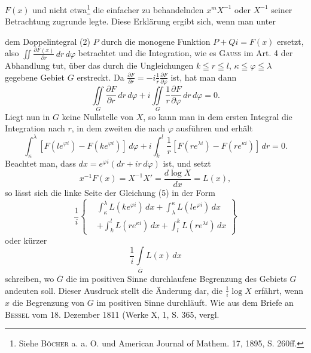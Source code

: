 \(F(x)\) und nicht etwa\footnote{Siehe \textsc{Bôcher} a. a. O. und American Journal of Mathem. 17, 1895, S. 260ff.} die einfacher zu behandelnden \(x^mX^{-1}\) oder \(X^{-1}\) seiner
Betrachtung zugrunde legte. Diese Erklärung ergibt sich, wenn man unter\par
\HistoricalFoot{}{21\textsuperscript{*}}
\clearpage{}
\noindent dem Doppelintegral (2) \(P\) durch die monogene Funktion \(P+Qi=F(x)\)
ersetzt, also \(\displaystyle\iint\frac{\partial F(x)}{\partial r}\,dr\,d\varphi\) betrachtet und die Integration, wie es \textsc{Gauss} im
Art. 4 der Abhandlung tut, über das durch die Ungleichungen \(k\leqq r\leqq l\),
\(\kappa\leqq\varphi\leqq\lambda\) gegebene Gebiet \(G\) erstreckt. Da \(\frac{\partial F}{\partial r}=-i\frac1r\frac{\partial F}{\partial\varphi}\) ist, hat man
dann
\[
\iint\limits_G\frac{\partial F}{\partial r}\,dr\,d\varphi
+i\iint\limits_G\frac1r\frac{\partial F}{\partial\varphi}\,dr\,d\varphi=0.
\]
Liegt nun in \(G\) keine Nullstelle von \(X\), so kann man in dem ersten Integral
die Integration nach \(r\), in dem zweiten die nach \(\varphi\) ausführen und erhält
\begingroup\makeatletter\tagsleft@true\let\veqno\leqno\makeatother
\begin{equation*}
\int_\kappa^\lambda[F(le^{\varphi i})-F(ke^{\varphi i})]\,d\varphi
+i\int_k^l\frac1r[F(re^{\lambda i})-F(re^{\kappa i})]\,dr=0.\tag{5}
\end{equation*}
\endgroup
\noindent Beachtet man, dass \(dx=e^{\varphi i}(dr+ir\,d\varphi)\) ist, und setzt
\[
x^{-1}F(x)=X^{-1}X'=\frac{d\log X}{dx}=L(x),
\]
so lässt sich die linke Seite der Gleichung (5) in der Form
\begingroup\makeatletter\tagsleft@true\let\veqno\leqno\makeatother
\begin{equation*}
\frac1i\left\{\begin{aligned}
&\int_\kappa^\lambda L(ke^{\varphi i})\,dx+\int_\lambda^\kappa L(le^{\varphi i})\,dx\\
&+\int_k^l L(re^{\kappa i})\,dx+\int_l^k L(re^{\lambda i})\,dx
\end{aligned}\right\}\tag{6}
\end{equation*}
\endgroup
\noindent oder kürzer
\[
\frac1i\int\limits_{\overline G}L(x)\,dx
\]
schreiben, wo \(\overline G\) die im positiven Sinne durchlaufene Begrenzung des Gebiets
\(G\) andeuten soll. Dieser Ausdruck stellt die Änderung dar, die \(\frac1i\log X\) erfährt,
wenn \(x\) die Begrenzung von \(G\) im positiven Sinne durchläuft. Wie
aus dem Briefe an \textsc{Bessel} vom 18. Dezember 1811 (Werke X, 1, S. 365, vergl.
